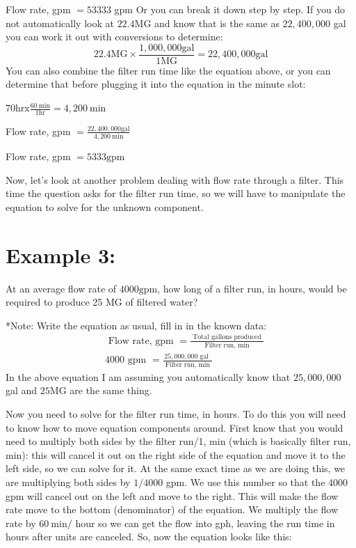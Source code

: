\documentclass[10pt]{article}
\begin{document}
Flow rate, gpm $=53333$ gpm Or you can break it down step by step. If you do not automatically look at $22.4 \mathrm{MG}$ and know that is the same as $22,400,000$ gal you can work it out with conversions to determine:
$$
22.4 \mathrm{MG} \times \frac{1,000,000 \mathrm{gal}}{1 \mathrm{MG}}=22,400,000 \mathrm{gal}
$$
You can also combine the filter run time like the equation above, or you can determine that before plugging it into the equation in the minute slot:

$70 \mathrm{hr} \mathrm{x} \frac{60 \mathrm{~min}}{1 \mathrm{hr}}=4,200 \mathrm{~min}$

Flow rate, gpm $=\frac{22,400,000 \mathrm{gal}}{4,200 \mathrm{~min}}$

Flow rate, gpm $=5333 \mathrm{gpm}$

Now, let's look at another problem dealing with flow rate through a filter. This time the question asks for the filter run time, so we will have to manipulate the equation to solve for the unknown component.

\section{Example 3:}
At an average flow rate of $4000 \mathrm{gpm}$, how long of a filter run, in hours, would be required to produce 25 MG of filtered water?

*Note: Write the equation as usual, fill in in the known data:
$$
\begin{aligned}
&\text { Flow rate, gpm }=\frac{\text { Total gallons produced }}{\text { Filter run, min }} \\
&4000 \text { gpm }=\frac{25,000,000 \text { gal }}{\text { Filter run, min }}
\end{aligned}
$$
In the above equation I am assuming you automatically know that $25,000,000$ gal and $25 \mathrm{MG}$ are the same thing.

Now you need to solve for the filter run time, in hours. To do this you will need to know how to move equation components around. First know that you would need to multiply both sides by the filter run/1, min (which is basically filter run, min): this will cancel it out on the right side of the equation and move it to the left side, so we can solve for it. At the same exact time as we are doing this, we are multiplying both sides by $1 / 4000$ gpm. We use this number so that the 4000 gpm will cancel out on the left and move to the right. This will make the flow rate move to the bottom (denominator) of the equation. We multiply the flow rate by $60 \mathrm{~min} /$ hour so we can get the flow into gph, leaving the run time in hours after units are canceled. So, now the equation looks like this:
\end{document}
